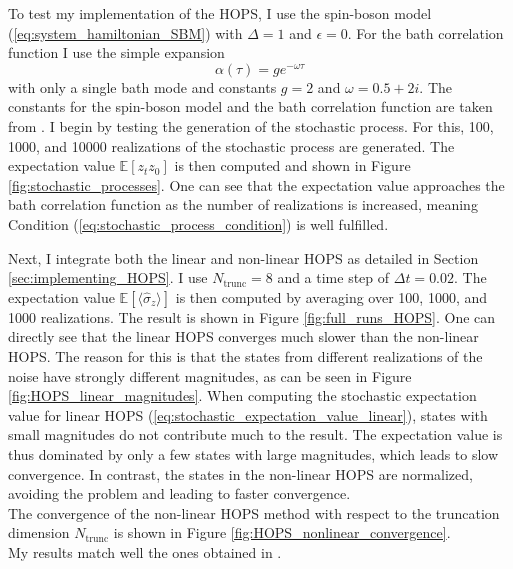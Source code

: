 To test my implementation of the HOPS, I use the spin-boson model (\ref{eq:system_hamiltonian_SBM}) with $\Delta = 1$ and $\epsilon = 0$. 
For the bath correlation function I use the simple expansion
\begin{equation}
    \label{eq:simple_hops_BCF}
    \alpha(\tau) = ge^{-\omega\tau}
\end{equation}
with only a single bath mode and constants $g = 2$ and $\omega = 0.5 + 2i$. The constants for the spin-boson model
and the bath correlation function are taken from \cite{Suess:2014}. I begin by testing the generation of the stochastic
process. For this, 100, 1000, and 10000 realizations of the stochastic process are generated. The expectation value
$\mathbb{E}{[z_tz_0]}$ is then computed and shown in Figure \ref{fig:stochastic_processes}.
One can see that the expectation value approaches the bath correlation function as the number of realizations is increased,
meaning Condition (\ref{eq:stochastic_process_condition}) is well fulfilled.


\newpage
\noindent Next, I integrate both the linear and non-linear HOPS as detailed in Section \ref{sec:implementing_HOPS}. I use $N_\text{trunc} = 8$
and a time step of $\Delta t = 0.02$. The expectation value
$\mathbb{E}\left\lbrack\langle\hat{\sigma}_z\rangle\right\rbrack$ is then computed by averaging over 100, 1000, and 1000 realizations.
The result is shown in Figure \ref{fig:full_runs_HOPS}.
One can directly see that the linear HOPS converges much slower than the non-linear HOPS. The reason for this is that the states from different
realizations of the noise have strongly different magnitudes, as can be seen in Figure \ref{fig:HOPS_linear_magnitudes}. When computing the stochastic expectation value for linear HOPS (\ref{eq:stochastic_expectation_value_linear}),
states with small magnitudes do not contribute much to the result. The expectation value is thus dominated by only a few states
with large magnitudes, which leads to slow convergence. In contrast, the states in the non-linear
HOPS are normalized, avoiding the problem and leading to faster convergence. \\
The convergence of the non-linear HOPS method with respect to the truncation dimension $N_\text{trunc}$ is shown in Figure \ref{fig:HOPS_nonlinear_convergence}.\\
My results match well the ones obtained in \cite{Suess:2014}.

